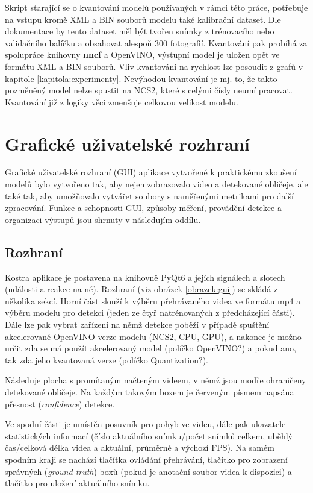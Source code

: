 Skript starající se o kvantování modelů používaných v rámci této práce, potřebuje na vstupu kromě XML a BIN souborů modelu také kalibrační dataset. Dle dokumentace by tento dataset měl být tvořen snímky z trénovacího nebo validačního balíčku a obsahovat alespoň 300 fotografií. Kvantování pak probíhá za spolupráce knihovny \textbf{nncf} a OpenVINO, výstupní model je uložen opět ve formátu XML a BIN souborů. Vliv kvantování na rychlost lze posoudit z grafů v kapitole \ref{kapitola:experimenty}. Nevýhodou kvantování je mj. to, že takto pozměněný model nelze spustit na NCS2, které s celými čísly neumí pracovat. Kvantování již z logiky věci zmenšuje celkovou velikost modelu.

\section{Grafické uživatelské rozhraní}
\label{sekce:gui}
Grafické uživatelské rozhraní (GUI) aplikace vytvořené k praktickému zkoušení modelů bylo vytvořeno tak, aby nejen zobrazovalo video a detekované obličeje, ale také tak, aby umožňovalo vytvářet soubory s naměřenými metrikami pro další zpracování. Funkce a schopnosti GUI, způsoby měření, provádění detekce a organizaci výstupů jsou shrnuty v následujím oddílu. 

\subsection*{Rozhraní}
Kostra aplikace je postavena na knihovně PyQt6 a jejích signálech a slotech (události a reakce na ně). Rozhraní (viz obrázek \ref{obrazek:gui}) se skládá z několika sekcí. Horní část slouží k výběru přehrávaného videa ve formátu mp4 a výběru modelu pro detekci (jeden ze čtyř natrénovaných z předcházející části). Dále lze pak vybrat zařízení na němž detekce poběží v případě spuštění akcelerované OpenVINO verze modelu (NCS2, CPU, GPU), a nakonec je možno určit zda se má použít akcelerovaný model (políčko OpenVINO?) a pokud ano, tak zda jeho kvantovaná verze (políčko Quantization?).

Následuje plocha s promítaným načteným videem, v němž jsou modře ohraničeny detekované obličeje. Na každým takovým boxem je červeným písmem napsána přesnost (\emph{confidence}) detekce.

Ve spodní části je umístěn posuvník pro pohyb ve videu, dále pak ukazatele statistických informací (číslo aktuálního snímku/počet snímků celkem, uběhlý čas/celková délka videa a aktuální, průměrné a výchozí FPS). Na samém spodním kraji se nachází tlačítka ovládání přehrávání, tlačítko pro zobrazení správných (\emph{ground truth}) boxů (pokud je anotační soubor videa k dispozici) a tlačítko pro uložení aktuálního snímku.


